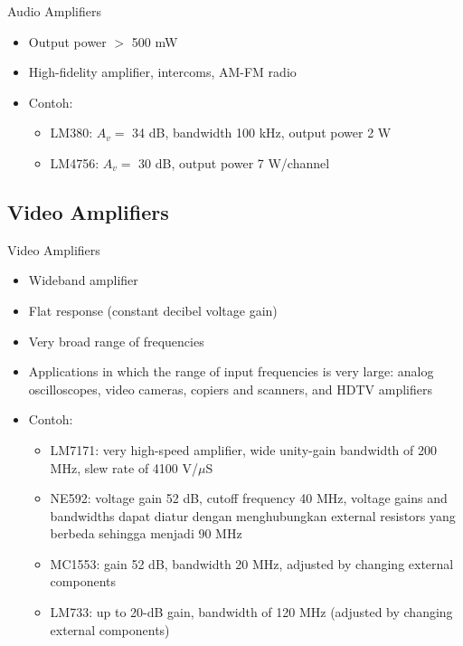\begin{frame}{Audio Amplifiers}
	\begin{itemize}
		\item Output power $ > $ 500 mW
		\item High-fidelity amplifier, intercoms, AM-FM radio
		\item Contoh:
		\begin{itemize}
			\item LM380: $ A_v = $ 34 dB, bandwidth 100 kHz, output power 2 W
			\item LM4756: $ A_v = $ 30 dB, output power 7 W/channel
		\end{itemize}
	\end{itemize}
\end{frame}

\subsection{Video Amplifiers}
\begin{frame}{Video Amplifiers}
	\begin{itemize}
		\item Wideband amplifier
		\item Flat response (constant decibel voltage gain)
		\item Very broad range of frequencies
		\item Applications in which the range of input frequencies is very large: analog oscilloscopes, video cameras, copiers and scanners, and HDTV amplifiers
		\item Contoh:
		\begin{itemize}
			\item LM7171: very high-speed amplifier, wide unity-gain bandwidth of 200 MHz, slew rate of 4100 V/$ \mu $S
			\item NE592: voltage gain 52 dB, cutoff frequency 40 MHz, voltage gains and bandwidths dapat diatur dengan menghubungkan external resistors yang berbeda sehingga menjadi 90 MHz
			\item MC1553: gain 52 dB, bandwidth 20 MHz, adjusted by changing
			external components
			\item LM733: up to 20-dB gain, bandwidth of 120 MHz (adjusted by changing external components)
		\end{itemize}
	\end{itemize}
\end{frame}

